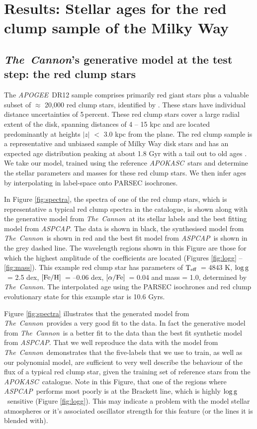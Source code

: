 \documentclass[12pt, preprint]{aastex}
\newcommand{\project}[1]{\textsl{#1}}
\newcommand{\tc}{\project{The~Cannon}}
\newcommand{\apogee}{\project{APOGEE}}
\newcommand{\apokasc}{\project{APOKASC}}
\newcommand{\aspcap}{\project{ASPCAP}}
\newcommand{\teff}{\mbox{$\rm T_{eff}$}}
\newcommand{\feh}{\mbox{$\rm [Fe/H]$}}
\newcommand{\alphafe}{\mbox{$\rm [\alpha/Fe]$}}
\newcommand{\logg}{\mbox{$\rm \log g$}}
\begin{document}
\section{Results: Stellar ages for the red clump sample of the Milky Way}

\subsection{\tc's generative model at the test step: the red clump stars}

The \apogee\ DR12 sample comprises primarily red giant stars plus a valuable subset of  $\approx$ 20,000 red clump stars, identified by \citet{Bovy2014}.  These stars have individual distance uncertainties of 5\,percent. These red clump stars cover a large radial extent of the disk, spanning distances of 4 -- 15 kpc and are located predominantly at heights $|z|$ $<$ 3.0 kpc from the plane. The red clump sample is a representative and unbiased sample of Milky Way disk stars and has an expected age distribution peaking at about 1.8 Gyr with a tail out to old ages \citep[see Figure 15 of][]{Bovy2014}. We take our model, trained using the reference \apokasc\ stars and determine the stellar parameters and masses for these red clump stars. We then infer ages by interpolating in label-space onto PARSEC isochrones.

In Figure \ref{fig:spectra}, the spectra of one of the red clump stars, which is representative a typical red clump spectra in the catalogue, is shown along with the generative model from \tc\ at its stellar labels and the best fitting model from \aspcap. The data is shown in black, the synthesised model from \tc\ is shown in red and the best fit model from \aspcap\ is shown in the grey dashed line. The wavelength regions shown in this Figure are those for which the highest amplitude of the coefficients are located (Figures \ref{fig:logg} -- \ref{fig:mass}).  This example red clump star has parameters of \teff\ = 4843 K, \logg\ = 2.5 dex, \feh\ = --0.06 dex, \alphafe\ = 0.04 and mass = 1.0, determined by \tc. The interpolated age using the PARSEC isochrones and red clump evolutionary state for this example star is 10.6 Gyrs. 

Figure \ref{fig:spectra} illustrates that the generated model from \tc\ provides a very good fit to the data. In fact the generative model from \tc\ is a better fit to the data than the best fit synthetic model from \aspcap. That we well reproduce the data with the model from \tc\ demonstrates that the five-labels that we use to train, as well as our polynomial model, are sufficient to very well describe the behaviour of the flux of a typical red clump star, given the training set of reference stars from the \apokasc\ catalogue. Note in this Figure, that one of the regions where \aspcap\ performs most poorly is  at the Brackett line, which is highly \logg\ sensitive (Figure \ref{fig:logg}). This may indicate a problem with the model stellar atmospheres or it's associated oscillator strength for this feature (or the lines it is blended with). 
\end{document}
